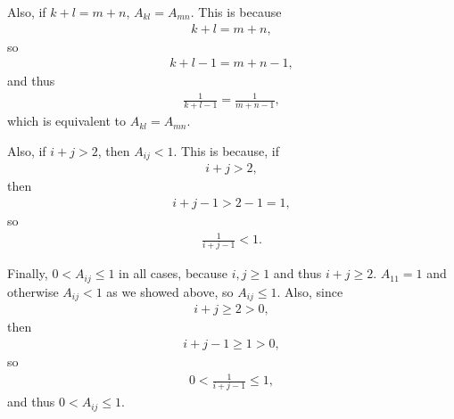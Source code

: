 \documentclass[12pt]{article}
\begin{document}
\begin{enumerate}
    Also, if $k + l = m + n$, $A_{kl} = A_{mn}$. This is because
    \begin{align*}
      k + l = m + n,
    \end{align*}
    so
    \begin{align*}
      k + l - 1 = m + n - 1,
    \end{align*}
    and thus
    \begin{align*}
      \frac{1}{k + l - 1} = \frac{1}{m + n - 1},
    \end{align*}
    which is equivalent to $A_{kl} = A_{mn}$.

    Also, if $i + j > 2$, then $A_{ij} < 1$. This is
    because, if
    \begin{align*}
      i + j > 2,
    \end{align*}
    then
    \begin{align*}
      i + j - 1 > 2 - 1 = 1,
    \end{align*}
    so
    \begin{align*}
      \frac{1}{i + j - 1} < 1.
    \end{align*}

    Finally, $0 < A_{ij} \leq 1$ in all cases, because $i,j \geq
    1$ and thus $i + j \geq 2$. $A_{11} = 1$ and otherwise
    $A_{ij} < 1$ as we showed above, so $A_{ij} \leq 1$. Also,
    since
    \begin{align*}
      i + j \geq 2 > 0,
    \end{align*}
    then
    \begin{align*}
      i + j - 1 \geq 1 > 0,
    \end{align*}
    so
    \begin{align*}
      0 < \frac{1}{i + j - 1} \leq 1,
    \end{align*}
    and thus $0 < A_{ij} \leq 1$.


\end{enumerate}
\end{document}
